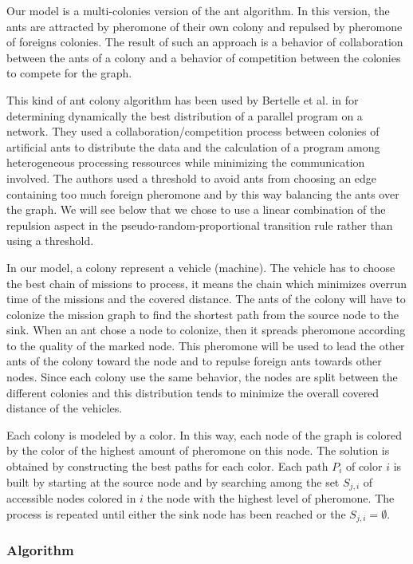 \documentclass[a4paper,10pt]{article}
\begin{document}
Our model is a multi-colonies version of the ant algorithm. In this version, the ants are attracted by pheromone of their own colony and repulsed by pheromone of foreigns colonies. The result of such an approach is a behavior of collaboration between the ants of a colony and a behavior of competition between the colonies to compete for the graph.

This kind of ant colony algorithm has been used by Bertelle et al. in \cite{Bertelle2006,Bertelle2007} for determining dynamically the best distribution of a parallel program on a network. They used a collaboration/competition process between colonies of artificial ants to distribute the data and the calculation of a program among heterogeneous processing ressources while minimizing the communication involved. The authors used a threshold to avoid ants from choosing an edge containing too much foreign pheromone and by this way balancing the ants over the graph. We will see below that we chose to use a linear combination of the repulsion aspect in the pseudo-random-proportional transition rule rather than using a threshold.

In our model, a colony represent a vehicle (machine). The vehicle has to choose the best chain of missions to process, it means the chain which minimizes overrun time of the missions and the covered distance. The ants of the colony will have to colonize the mission graph to find the shortest path from the source node to the sink. When an ant chose a node to colonize, then it spreads pheromone according to the quality of the marked node. This pheromone will be used to lead the other ants of the colony toward the node and to repulse foreign ants towards other nodes.
Since each colony use the same behavior, the nodes are split between the different colonies and this distribution tends to minimize the overall covered distance of the vehicles.

Each colony is modeled by a color. In this way, each node of the graph is colored by the color of the highest amount of pheromone on this node. The solution is obtained by constructing the best paths for each color. Each path $P_i$ of color $i$ is built by starting at the source node and by searching among the set $S_{j,i}$ of accessible nodes colored in $i$ the node with the highest level of pheromone. The process is repeated until either the sink node has been reached or the $S_{j,i} = \emptyset$.

\subsubsection{Algorithm}
\end{document}
